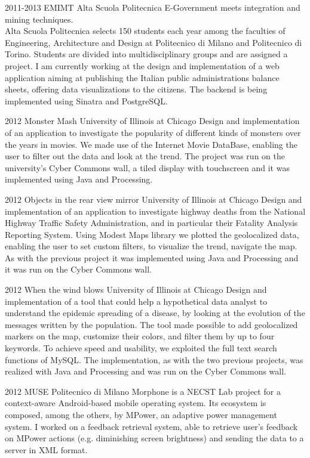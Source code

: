\documentclass[]{friggeri-cv} %
\begin{document}
\begin{entrylist}
\entry
{2011-2013}
{EMIMT}
{Alta Scuola Politecnica}
{
    E-Government meets integration and mining techniques.\\
    Alta Scuola Politecnica selects 150 students each year among the faculties of Engineering,
    Architecture and Design at Politecnico di Milano and Politecnico di Torino. Students are divided
    into multidisciplinary groups and are assigned a project. I am currently working at the design and
    implementation of a web application aiming at publishing the Italian public administrations
    balance sheets, offering data visualizations to the citizens. The  backend
    is being implemented using Sinatra and PostgreSQL.
}

\entry
{2012}
{Monster Mash}
{University of Illinois at Chicago}
{
    Design and implementation of an application to investigate the popularity of different kinds of monsters over the years in movies.
    We made use of the Internet Movie DataBase, enabling the user to filter out the data and look at the trend. The project was run on the university's Cyber Commons wall, a tiled display with touchscreen and it was implemented using Java and Processing.
}

\entry
{2012}
{Objects in the rear view mirror}
{University of Illinois at Chicago}
{
    Design and implementation of an application to investigate highway deaths from the National Highway Traffic Safety Administration, and in particular their Fatality Analysis Reporting System.
    Using Modest Maps library we plotted the geolocalized data, enabling the user to set custom filters, to visualize the trend, navigate the map. As with the previous project it was implemented
    using Java and Processing and it was run on the Cyber Commons wall.
}

\entry
{2012}
{When the wind blows}
{University of Illinois at Chicago}
{
    Design and implementation of a tool that could help a hypothetical data analyst to understand the
    epidemic spreading of a disease, by looking at the evolution of the messages written by the
    population.
    The tool made possible to add geolocalized markers on the map, customize their colors, and filter
    them by up to four keywords. To achieve speed and usability, we exploited the full text search
    functions of MySQL. The implementation, as with the two previous projects, was realized with
    Java and Processing and was run on the Cyber Commons wall.
}

\entry
{2012}
{MUSE}
{Politecnico di Milano}
{
    Morphone is a NECST Lab project for a context-aware Android-based mobile operating system. Its
    ecosystem is composed, among the others, by MPower, an adaptive power management system. I worked
    on a feedback retrieval system, able to retrieve user's feedback on MPower actions (e.g.
    diminishing screen brightness) and sending the data to a server in XML format.
}
\end{entrylist}
\end{document}
